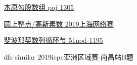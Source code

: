 


\vbox{}

\vbox{}

\begin{problemset}
	\item \href{http://poj.org/problem?id=1305}{本原勾股数组 \quad poj 1305}
	\item \href{https://nanti.jisuanke.com/t/41421}{圆上整点/高斯素数 \quad 2019上海网络赛}
	\item \href{https://www.51nod.com/Challenge/Problem.html#problemId=1195}{斐波那契数列循环节 \quad 51nod-1195}
	\item dfs similar \quad 2019icpc亚洲区域赛-南昌站B题
\end{problemset}


\nocite{*} 

